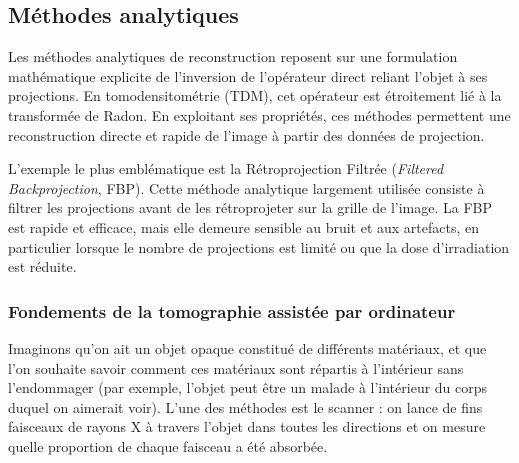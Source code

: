 \subsection{Méthodes analytiques}
Les méthodes analytiques de reconstruction reposent sur une formulation mathématique explicite
de l'inversion de l'opérateur direct reliant l'objet à ses projections. En tomodensitométrie (TDM),
cet opérateur est étroitement lié à la transformée de Radon. En exploitant ses propriétés, ces
méthodes permettent une reconstruction directe et rapide de l'image à partir des données de
projection.

L'exemple le plus emblématique est la Rétroprojection Filtrée (\emph{Filtered Backprojection},
FBP). Cette méthode analytique largement utilisée consiste à filtrer les projections avant de
les rétroprojeter sur la grille de l'image. La FBP est rapide et efficace, mais elle demeure
sensible au bruit et aux artefacts, en particulier lorsque le nombre de projections est limité
ou que la dose d'irradiation est réduite.


\subsubsection{Fondements de la tomographie assistée par ordinateur}
Imaginons qu'on ait un objet opaque constitué de différents matériaux, et que l'on souhaite savoir comment ces matériaux sont répartis à l'intérieur sans l'endommager (par exemple, l'objet peut être un malade à l'intérieur du corps duquel on aimerait voir). L'une des méthodes est le scanner  : on lance de fins faisceaux de rayons X à travers l'objet dans toutes les directions et on mesure quelle proportion de chaque faisceau a été absorbée.

